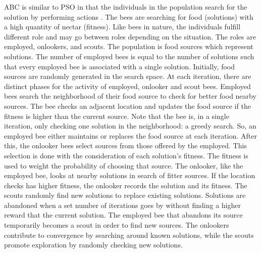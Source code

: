 \documentclass{tamuccthesis}
\begin{document}
ABC is similar to PSO in that the individuals in the population search for the solution by performing actions \cite{bee_ga:carballo:2017}. The bees are searching for food (solutions) with a high quantity of nectar (fitness). Like bees in nature, the individuals fulfill different role and may go between roles depending on the situation. The roles are employed, onlookers, and scouts. The population is food sources which represent solutions. The number of employed bees is equal to the number of solutions such that every employed bee is associated with a single solution. Initially, food sources are randomly generated in the search space. At each iteration, there are distinct phases for the activity of employed, onlooker and scout bees. Employed bees search the neighborhood of their food source to check for better food nearby sources. The bee checks an adjacent location and updates the food source if the fitness is higher than the current source. Note that the bee is, in a single iteration, only checking one solution in the neighborhood: a greedy search. So, an employed bee either maintains or replaces the food source at each iteration. After this, the onlooker bees select sources from those offered by the employed. This selection is done with the consideration of each solution's fitness. The fitness is used to weight the probability of choosing that source. The onlooker, like the employed bee, looks at nearby solutions in search of fitter sources. If the location checks has higher fitness, the onlooker records the solution and its fitness. The scouts randomly find new solutions to replace existing solutions. Solutions are abandoned when a set number of iterations goes by without finding a higher reward that the current solution. The employed bee that abandons its source temporarily becomes a scout in order to find new sources. The onlookers contribute to convergence by searching around known solutions, while the scouts promote exploration by randomly checking new solutions. 
\end{document}
